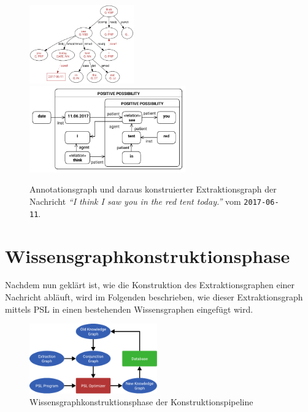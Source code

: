 \begin{figure}[h]
	\includegraphics[width=0.4\textwidth]{gfx/text2kg/annotationGraph1.pdf}
	\includegraphics[width=0.6\textwidth]{gfx/text2kg/extractionGraph1.pdf}
	\caption{Annotationsgraph und daraus konstruierter Extraktionsgraph der Nachricht \textit{``I think I saw you in the red tent today.''} vom \texttt{2017-06-11}.}\label{fig:text2kg:extractionGraph1} %
\end{figure}

\section{Wissensgraphkonstruktionsphase}%
\label{sec:text2kg:psl}

Nachdem nun geklärt ist, wie die Konstruktion des Extraktionsgraphen einer Nachricht abläuft, wird im Folgenden beschrieben, wie dieser Extraktionsgraph mittels PSL in einen bestehenden Wissensgraphen eingefügt wird.

\begin{figure}[h]
	\centering
	\includegraphics[width=0.49\textwidth]{gfx/text2kg/pslPhase.pdf}
	\caption{Wissensgraphkonstruktionsphase der Konstruktionspipeline}\label{fig:text2kg:pslPhase}
\end{figure}


